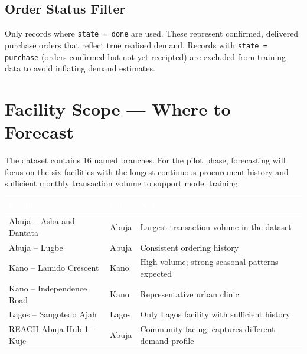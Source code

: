 \documentclass[12pt, a4paper]{article}
\begin{document}
\subsection{Order Status Filter}

Only records where \texttt{state = done} are used. These represent confirmed,
delivered purchase orders that reflect true realised demand. Records with
\texttt{state = purchase} (orders confirmed but not yet receipted) are excluded
from training data to avoid inflating demand estimates.

\section{Facility Scope --- Where to Forecast}

The dataset contains 16 named branches. For the pilot phase, forecasting will
focus on the six facilities with the longest continuous procurement history and
sufficient monthly transaction volume to support model training.

\vspace{0.8em}
\noindent
\begin{tabularx}{\textwidth}{@{} L{4.5cm} C{2.5cm} X @{}}
  \toprule
  \textcolor{white}{\textbf{Facility}} &
  \textcolor{white}{\textbf{City}} &
  \textcolor{white}{\textbf{Notes}} \\
  \midrule
  Abuja -- Asba and Dantata  & Abuja & Largest transaction volume in the dataset \\
  \addlinespace[2pt]
  Abuja -- Lugbe             & Abuja & Consistent ordering history \\
  \addlinespace[2pt]
  Kano -- Lamido Crescent    & Kano  & High-volume; strong seasonal patterns expected \\
  \addlinespace[2pt]
  Kano -- Independence Road  & Kano  & Representative urban clinic \\
  \addlinespace[2pt]
  Lagos -- Sangotedo Ajah    & Lagos & Only Lagos facility with sufficient history \\
  \addlinespace[2pt]
  REACH Abuja Hub 1 -- Kuje  & Abuja & Community-facing; captures different demand profile \\
  \bottomrule
\end{tabularx}

\vspace{1em}
\end{document}
